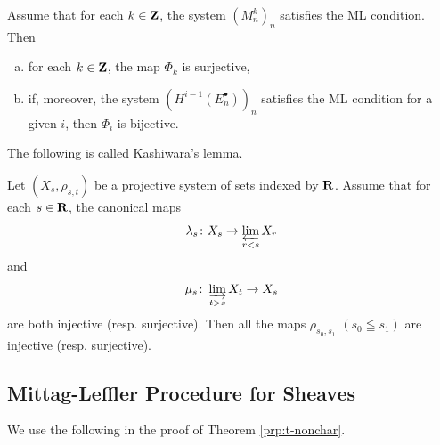\begin{Proposition+}[{\cite[Proposition 1.12.4]{KS90}}]\label{prop:ks1.12.4}
  Assume that for each \(k\in\zz\), 
  the system \(\left(M_{n}^{k}\right)_{n}\) satisfies 
  the ML condition. 
  Then
  \begin{enumerate}[(a)]
    \item for each \(k\in \zz\), 
    the map \(\varPhi_k\) is surjective,
    \item if, moreover, 
    the system \(\left(H^{i-1}(E_{n}^{\bullet})\right)_{n}\) 
    satisfies the ML condition for a given \(i\), 
    then \(\varPhi_i\) is bijective.
  \end{enumerate} 
\end{Proposition+}

The following is called Kashiwara's lemma.

\begin{Proposition+}[{\cite[Proposition 1.12.6]{KS90}}]\label{prop:ks1.12.6}
  Let \(\left(X_s,\rho_{s,t}\right)\) be 
  a projective system of sets indexed by \(\rr\). 
  Assume that for each \(s\in\rr\), the canonical maps\[
    \lambda_s\colon X_s\to\prolim[r<s]X_r
  \] and \[
    \mu_s\colon \indlim[t>s]X_t\to X_s
  \] are both injective (resp. surjective). 
  Then all the maps \(\rho_{s_{0},s_{1}}\) \((s_0\leqq s_1)\) are 
  injective (resp. surjective).
\end{Proposition+}

\subsection{Mittag-Leffler Procedure for Sheaves}

We use the following 
in the proof of Theorem \ref{prp:t-nonchar}.

